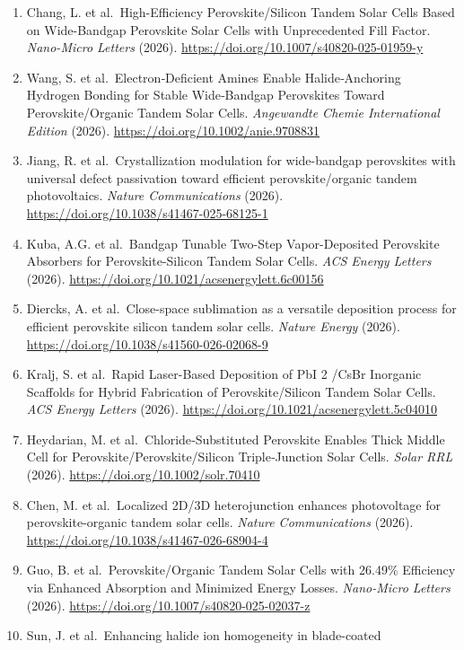 \documentclass[
  11pt,
]{article}
\begin{document}
\begin{enumerate}
  \url{https://doi.org/10.1038/s41467-026-72094-4}
\item
  Chang, L. et al.~High-Efficiency Perovskite/Silicon Tandem Solar Cells
  Based on Wide-Bandgap Perovskite Solar Cells with Unprecedented Fill
  Factor. \emph{Nano-Micro Letters} (2026).
  \url{https://doi.org/10.1007/s40820-025-01959-y}
\item
  Wang, S. et al.~Electron‐Deficient Amines Enable Halide‐Anchoring
  Hydrogen Bonding for Stable Wide‐Bandgap Perovskites Toward
  Perovskite/Organic Tandem Solar Cells. \emph{Angewandte Chemie
  International Edition} (2026).
  \url{https://doi.org/10.1002/anie.9708831}
\item
  Jiang, R. et al.~Crystallization modulation for wide-bandgap
  perovskites with universal defect passivation toward efficient
  perovskite/organic tandem photovoltaics. \emph{Nature Communications}
  (2026). \url{https://doi.org/10.1038/s41467-025-68125-1}
\item
  Kuba, A.G. et al.~Bandgap Tunable Two-Step Vapor-Deposited Perovskite
  Absorbers for Perovskite-Silicon Tandem Solar Cells. \emph{ACS Energy
  Letters} (2026). \url{https://doi.org/10.1021/acsenergylett.6c00156}
\item
  Diercks, A. et al.~Close-space sublimation as a versatile deposition
  process for efficient perovskite silicon tandem solar cells.
  \emph{Nature Energy} (2026).
  \url{https://doi.org/10.1038/s41560-026-02068-9}
\item
  Kralj, S. et al.~Rapid Laser-Based Deposition of PbI 2 /CsBr Inorganic
  Scaffolds for Hybrid Fabrication of Perovskite/Silicon Tandem Solar
  Cells. \emph{ACS Energy Letters} (2026).
  \url{https://doi.org/10.1021/acsenergylett.5c04010}
\item
  Heydarian, M. et al.~Chloride‐Substituted Perovskite Enables Thick
  Middle Cell for Perovskite/Perovskite/Silicon Triple‐Junction Solar
  Cells. \emph{Solar RRL} (2026).
  \url{https://doi.org/10.1002/solr.70410}
\item
  Chen, M. et al.~Localized 2D/3D heterojunction enhances photovoltage
  for perovskite-organic tandem solar cells. \emph{Nature
  Communications} (2026).
  \url{https://doi.org/10.1038/s41467-026-68904-4}
\item
  Guo, B. et al.~Perovskite/Organic Tandem Solar Cells with 26.49\%
  Efficiency via Enhanced Absorption and Minimized Energy Losses.
  \emph{Nano-Micro Letters} (2026).
  \url{https://doi.org/10.1007/s40820-025-02037-z}
\item
  Sun, J. et al.~Enhancing halide ion homogeneity in blade-coated

\end{enumerate}
\end{document}
